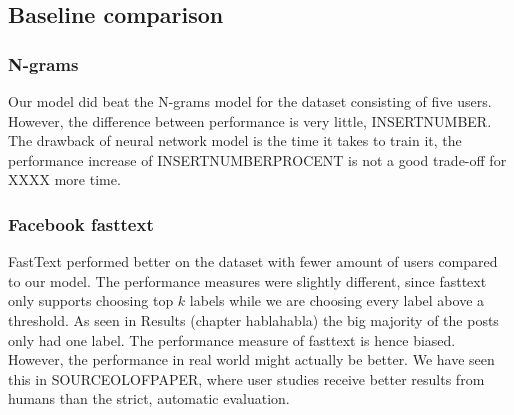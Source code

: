 \subsection{Baseline comparison}
\subsubsection{N-grams}
Our model did beat the N-grams model for the dataset consisting of five users. However, the difference between performance is very little, INSERTNUMBER. The drawback of neural network model is the time it takes to train it, the performance increase of INSERTNUMBERPROCENT is not a good trade-off for XXXX more time.
\subsubsection{Facebook fasttext}
FastText performed better on the dataset with fewer amount of users compared to our model. The performance measures were slightly different, since fasttext only supports choosing top $k$ labels while we are choosing every label above a threshold. As seen in Results (chapter hablahabla) the big majority of the posts only had one label. The performance measure of fasttext is hence biased. However, the performance in real world might actually be better. We have seen this in SOURCEOLOFPAPER, where user studies receive better results from humans than the strict, automatic evaluation.
